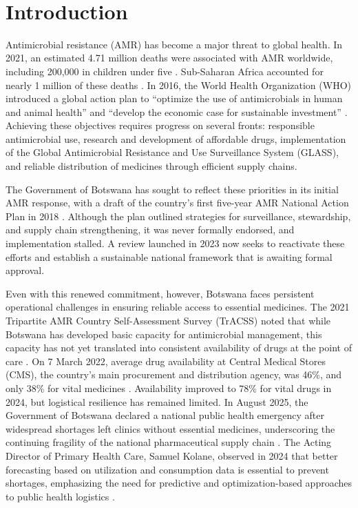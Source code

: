 \documentclass{article}
\begin{document}
\

\newpage
\tableofcontents
\newpage
\section{Introduction}

Antimicrobial resistance (AMR) has become a major threat to global health. In 2021, an estimated 4.71 million deaths were associated with AMR worldwide, including 200,000 in children under five \cite{Naghavi}. Sub-Saharan Africa accounted for nearly 1 million of these deaths \cite{IHME}. In 2016, the World Health Organization (WHO) introduced a global action plan to ``optimize the use of antimicrobials in human and animal health'' and ``develop the economic case for sustainable investment'' \cite{WHOAMR}. Achieving these objectives requires progress on several fronts: responsible antimicrobial use, research and development of affordable drugs, implementation of the Global Antimicrobial Resistance and Use Surveillance System (GLASS), and reliable distribution of medicines through efficient supply chains.  

The Government of Botswana has sought to reflect these priorities in its initial AMR response, with a draft of the country's first five-year AMR National Action Plan in 2018 \cite{BotsAMR}. Although the plan outlined strategies for surveillance, stewardship, and supply chain strengthening, it was never formally endorsed, and implementation stalled. A review launched in 2023 now seeks to reactivate these efforts and establish a sustainable national framework that is awaiting formal approval.  

Even with this renewed commitment, however, Botswana faces persistent operational challenges in ensuring reliable access to essential medicines. The 2021 Tripartite AMR Country Self-Assessment Survey (TrACSS) noted that while Botswana has developed basic capacity for antimicrobial management, this capacity has not yet translated into consistent availability of drugs at the point of care \cite{who2021tracss}. On 7 March 2022, average drug availability at Central Medical Stores (CMS), the country’s main procurement and distribution agency, was 46\%, and only 38\% for vital medicines \cite{BotswanaCMS}. Availability improved to 78\% for vital drugs in 2024, but logistical resilience has remained limited. In August 2025, the Government of Botswana declared a national public health emergency after widespread shortages left clinics without essential medicines, underscoring the continuing fragility of the national pharmaceutical supply chain \cite{reut25}. The Acting Director of Primary Health Care, Samuel Kolane, observed in 2024 that better forecasting based on utilization and consumption data is essential to prevent shortages, emphasizing the need for predictive and optimization-based approaches to public health logistics \cite{BotsProc}.  
\end{document}
